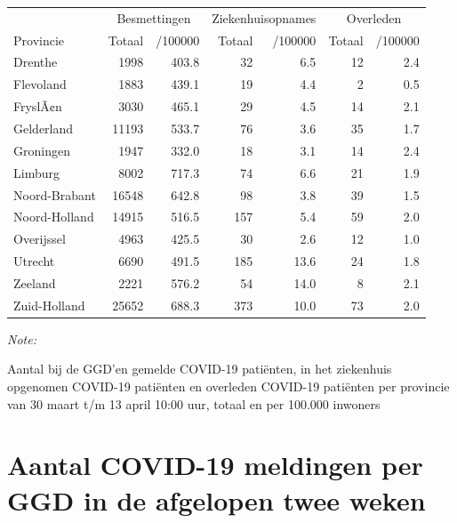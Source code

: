 \documentclass[
  english,
  man,floatsintext]{apa6}
\begin{document}
\begin{table}
\centering
\begin{threeparttable}
\begin{tabular}{lrrrrrr}
\toprule
\multicolumn{1}{c}{ } & \multicolumn{2}{c}{Besmettingen} & \multicolumn{2}{c}{Ziekenhuisopnames} & \multicolumn{2}{c}{Overleden} \\
\cmidrule(l{3pt}r{3pt}){2-3} \cmidrule(l{3pt}r{3pt}){4-5} \cmidrule(l{3pt}r{3pt}){6-7}
Provincie & Totaal & /100000 & Totaal & /100000 & Totaal & /100000\\
\midrule
Drenthe & 1998 & 403.8 & 32 & 6.5 & 12 & 2.4\\
Flevoland & 1883 & 439.1 & 19 & 4.4 & 2 & 0.5\\
FryslÃ¢n & 3030 & 465.1 & 29 & 4.5 & 14 & 2.1\\
Gelderland & 11193 & 533.7 & 76 & 3.6 & 35 & 1.7\\
Groningen & 1947 & 332.0 & 18 & 3.1 & 14 & 2.4\\
Limburg & 8002 & 717.3 & 74 & 6.6 & 21 & 1.9\\
Noord-Brabant & 16548 & 642.8 & 98 & 3.8 & 39 & 1.5\\
Noord-Holland & 14915 & 516.5 & 157 & 5.4 & 59 & 2.0\\
Overijssel & 4963 & 425.5 & 30 & 2.6 & 12 & 1.0\\
Utrecht & 6690 & 491.5 & 185 & 13.6 & 24 & 1.8\\
Zeeland & 2221 & 576.2 & 54 & 14.0 & 8 & 2.1\\
Zuid-Holland & 25652 & 688.3 & 373 & 10.0 & 73 & 2.0\\
\bottomrule
\end{tabular}
\begin{tablenotes}
\item \textit{Note: } 
\item Aantal bij de GGD’en gemelde COVID-19 patiënten, in het ziekenhuis opgenomen COVID-19 patiënten en overleden COVID-19 patiënten per provincie van 30 maart t/m 13 april 10:00 uur, totaal en per 100.000 inwoners
\end{tablenotes}
\end{threeparttable}
\end{table}

\newpage

\hypertarget{aantal-covid-19-meldingen-per-ggd-in-de-afgelopen-twee-weken}{%
\section{Aantal COVID-19 meldingen per GGD in de afgelopen twee weken}\label{aantal-covid-19-meldingen-per-ggd-in-de-afgelopen-twee-weken}}
\end{document}
